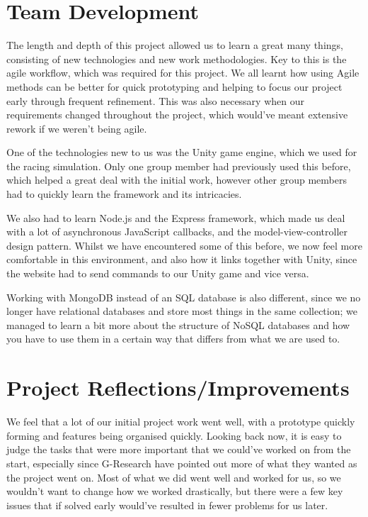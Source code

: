 \section{Team Development}

The length and depth of this project allowed us to learn a great many things, consisting of new technologies and new work methodologies. Key to this is the agile workflow, which was required for this project. We all learnt how using Agile methods can be better for quick prototyping and helping to focus our project early through frequent refinement. This was also necessary when our requirements changed throughout the project, which would've meant extensive rework if we weren't being agile.

One of the technologies new to us was the Unity game engine, which we used for the racing simulation. Only one group member had previously used this before, which helped a great deal with the initial work, however other group members had to quickly learn the framework and its intricacies. 

We also had to learn Node.js and the Express framework, which made us deal with a lot of asynchronous JavaScript callbacks, and the model-view-controller design pattern. Whilst we have encountered some of this before, we now feel more comfortable in this environment, and also how it links together with Unity, since the website had to send commands to our Unity game and vice versa.

Working with MongoDB instead of an SQL database is also different, since we no longer have relational databases and store most things in the same collection; we managed to learn a bit more about the structure of NoSQL databases and how you have to use them in a certain way that differs from what we are used to.

\section{Project Reflections/Improvements}

We feel that a lot of our initial project work went well, with a prototype quickly forming and features being organised quickly. Looking back now, it is easy to judge the tasks that were more important that we could've worked on from the start, especially since G-Research have pointed out more of what they wanted as the project went on. Most of what we did went well and worked for us, so we wouldn't want to change how we worked drastically, but there were a few key issues that if solved early would've resulted in fewer problems for us later.

